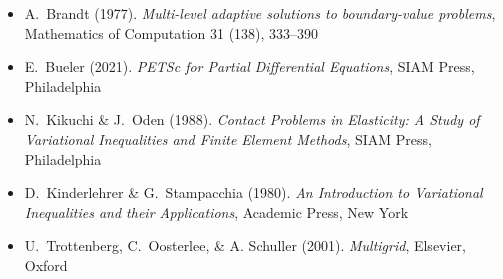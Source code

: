 
\newcommand{\sdoi}[1]{\,{\tiny \href{https://doi.org/#1}{doi:#1}}}
\begin{itemize}
\item[] A.~Brandt (1977). \emph{Multi-level adaptive solutions to boundary-value problems}, Mathematics of Computation 31 (138), 333--390
\item[] E.~Bueler (2021). \emph{PETSc for Partial Differential Equations}, SIAM Press, Philadelphia
\item[] N.~Kikuchi \& J.~Oden (1988).  \emph{Contact Problems in Elasticity: A Study of Variational Inequalities and Finite Element Methods}, SIAM Press, Philadelphia
\item[] D.~Kinderlehrer \& G.~Stampacchia (1980). \emph{An Introduction to Variational Inequalities and their Applications}, Academic Press, New York
\item[] U.~Trottenberg, C.~Oosterlee, \& A. Schuller (2001).  \emph{Multigrid}, Elsevier, Oxford
\end{itemize}

